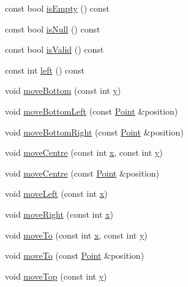 \begin{DoxyCompactItemize}
const bool \hyperlink{classprism_1_1_rect_aeaebf58b96d705192d3550fb085b5338}{is\+Empty} () const 
\item 
const bool \hyperlink{classprism_1_1_rect_a5bcde85987680d025c52f028fb8cbcea}{is\+Null} () const 
\item 
const bool \hyperlink{classprism_1_1_rect_a7a864d1c2f55c2758d05e23f131a2364}{is\+Valid} () const 
\item 
const int \hyperlink{classprism_1_1_rect_a75ddb96d128ac7b913865be7dbcd865e}{left} () const 
\item 
void \hyperlink{classprism_1_1_rect_ad9305fe8528c64db65ef9bd34c3578b8}{move\+Bottom} (const int \hyperlink{classprism_1_1_rect_a6e951744e0bba0fed781b86ab0be680b}{y})
\item 
void \hyperlink{classprism_1_1_rect_adbbb1cabc46780b605f3400c5ee4e39e}{move\+Bottom\+Left} (const \hyperlink{classprism_1_1_point}{Point} \&position)
\item 
void \hyperlink{classprism_1_1_rect_a88696414c9cbcc840805482d09a83e65}{move\+Bottom\+Right} (const \hyperlink{classprism_1_1_point}{Point} \&position)
\item 
void \hyperlink{classprism_1_1_rect_a4de806d7ddbe4ec946aef7843e5b4ac7}{move\+Centre} (const int \hyperlink{classprism_1_1_rect_a202fa9a56964c9111a968fb9b420f5f4}{x}, const int \hyperlink{classprism_1_1_rect_a6e951744e0bba0fed781b86ab0be680b}{y})
\item 
void \hyperlink{classprism_1_1_rect_a14862b09cf80442e9a4a9996ace251d0}{move\+Centre} (const \hyperlink{classprism_1_1_point}{Point} \&position)
\item 
void \hyperlink{classprism_1_1_rect_af1d84466fd81536d7fcd1a9e3084a8cb}{move\+Left} (const int \hyperlink{classprism_1_1_rect_a202fa9a56964c9111a968fb9b420f5f4}{x})
\item 
void \hyperlink{classprism_1_1_rect_a3da54bd285c3c4aae449b276cca81c29}{move\+Right} (const int \hyperlink{classprism_1_1_rect_a202fa9a56964c9111a968fb9b420f5f4}{x})
\item 
void \hyperlink{classprism_1_1_rect_aa89a93ae63e2fd0dae063509f588f253}{move\+To} (const int \hyperlink{classprism_1_1_rect_a202fa9a56964c9111a968fb9b420f5f4}{x}, const int \hyperlink{classprism_1_1_rect_a6e951744e0bba0fed781b86ab0be680b}{y})
\item 
void \hyperlink{classprism_1_1_rect_a7ee7a73b5cba4d3e3fcd048d77bceaa8}{move\+To} (const \hyperlink{classprism_1_1_point}{Point} \&position)
\item 
void \hyperlink{classprism_1_1_rect_a1b1e4d524a29d32eab8c0938b6ae5246}{move\+Top} (const int \hyperlink{classprism_1_1_rect_a6e951744e0bba0fed781b86ab0be680b}{y})

\end{DoxyCompactItemize}
